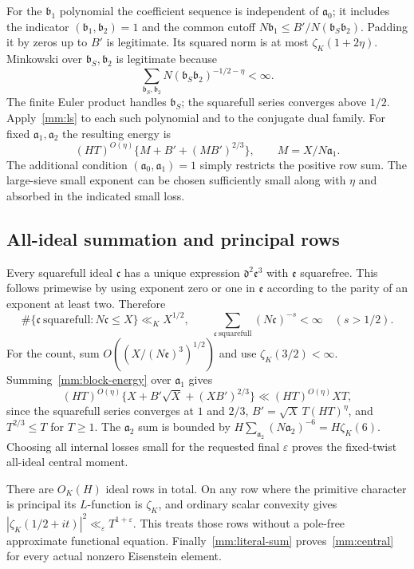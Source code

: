 For the $\mathfrak b_1$ polynomial the coefficient sequence is
independent of $\mathfrak a_0$; it includes the indicator
$(\mathfrak b_1,\mathfrak b_2)=1$ and the common cutoff
$N\mathfrak b_1\le B'/N(\mathfrak b_S\mathfrak b_2)$.
Padding it by zeros up to $B'$ is legitimate. Its squared norm is at most
$\zeta_K(1+2\eta)$. Minkowski over $\mathfrak b_S,\mathfrak b_2$
is legitimate because
\[
 \sum_{\mathfrak b_S,\mathfrak b_2}
       N(\mathfrak b_S\mathfrak b_2)^{-1/2-\eta}<\infty.
\]
The finite Euler product handles $\mathfrak b_S$; the squarefull series
converges above $1/2$. Apply~\eqref{mm:ls} to each such polynomial and
to the conjugate dual family. For fixed $\mathfrak a_1,\mathfrak a_2$
the resulting energy is
\begin{equation}\label{mm:block-energy}
 (HT)^{O(\eta)}\{M+B'+(MB')^{2/3}\},\qquad
 M=X/N\mathfrak a_1.
\end{equation}
The additional condition $(\mathfrak a_0,\mathfrak a_1)=1$ simply
restricts the positive row sum. The large-sieve small exponent can be
chosen sufficiently small along with $\eta$ and absorbed in the
indicated small loss.

\subsection{All-ideal summation and principal rows}
Every squarefull ideal $\mathfrak c$ has a unique expression
$\mathfrak d^2\mathfrak e^3$ with $\mathfrak e$ squarefree.
This follows primewise by using exponent zero or one in $\mathfrak e$
according to the parity of an exponent at least two. Therefore
\[
 \#\{\mathfrak c\ \mathrm{squarefull}:N\mathfrak c\le X\}
 \ll_K X^{1/2},\qquad
 \sum_{\mathfrak c\ \mathrm{squarefull}}(N\mathfrak c)^{-s}<\infty
 \quad(s>1/2).
\]
For the count, sum
$O((X/(N\mathfrak e)^3)^{1/2})$ and use
$\zeta_K(3/2)<\infty$. Summing~\eqref{mm:block-energy} over
$\mathfrak a_1$ gives
\[
 (HT)^{O(\eta)}
 \{X+B'\sqrt X+(XB')^{2/3}\}
 \ll (HT)^{O(\eta)}XT,
\]
since the squarefull series converges at $1$ and $2/3$,
$B'=\sqrt X\,T(HT)^\eta$, and $T^{2/3}\le T$ for $T\ge1$.
The $\mathfrak a_2$ sum is bounded by
$H\sum_{\mathfrak a_2}(N\mathfrak a_2)^{-6}=H\zeta_K(6)$.
Choosing all internal losses small for the requested final
$\varepsilon$ proves the fixed-twist all-ideal central moment.

There are $O_K(H)$ ideal rows in total. On any row where the primitive
character is principal its $L$-function is $\zeta_K$, and ordinary
scalar convexity gives
$|\zeta_K(1/2+it)|^2\ll_\varepsilon T^{1+\varepsilon}$.
This treats those rows without a pole-free approximate functional
equation. Finally~\eqref{mm:literal-sum} proves~\eqref{mm:central}
for every actual nonzero Eisenstein element.

